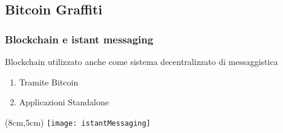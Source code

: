 \subsection{Bitcoin Graffiti}
\begin{frame}
 \frametitle{Blockchain e istant messaging}
 
 Blockchain utilizzato anche come sistema decentralizzato di messaggistica
 \begin{enumerate}
  \item<1-> Tramite Bitcoin
  \item<2-> Applicazioni Standalone
 \end{enumerate}
 
 \begin{textblock*}{5cm}(8cm,5cm)
  \texttt{[image: istantMessaging]}
 \end{textblock*}

\end{frame}
